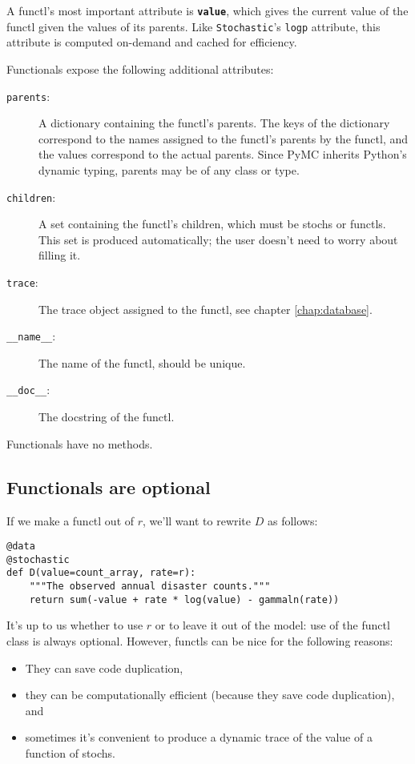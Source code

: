 A functl's most important attribute is \texttt{\bfseries value}, which gives the current value of the functl given the values of its parents. Like \texttt{Stochastic}'s \texttt{logp} attribute, this attribute is computed on-demand and cached for efficiency.

Functionals expose the following additional attributes:
\begin{description}
    \item[\texttt{parents}:] A dictionary containing the functl's parents. The keys of the dictionary correspond to the names assigned to the functl's parents by the functl, and the values correspond to the actual parents. Since PyMC inherits Python's dynamic typing, parents may be of any class or type.
    \item[\texttt{children}:] A set containing the functl's children, which must be stochs or functls. This set is produced automatically; the user doesn't need to worry about filling it.
    \item[\texttt{trace}:] The trace object assigned to the functl, see chapter \ref{chap:database}.
    \item[\texttt{\_\_name\_\_}:] The name of the functl, should be unique.
    \item[\texttt{\_\_doc\_\_}:] The docstring of the functl.
\end{description}
Functionals have no methods.

\subsection{Functionals are optional}
If we make a functl out of $r$, we'll want to rewrite $D$ as follows:
\begin{verbatim}
@data
@stochastic
def D(value=count_array, rate=r):
    """The observed annual disaster counts."""
    return sum(-value + rate * log(value) - gammaln(rate))
\end{verbatim}
It's up to us whether to use $r$ or to leave it out of the model: use of the functl class is always optional. However, functls can be nice for the following reasons:
\begin{itemize}
    \item They can save code duplication,    
    \item they can be computationally efficient (because they save code duplication), and
    \item sometimes it's convenient to produce a dynamic trace of the value of a function of stochs.
\end{itemize}



